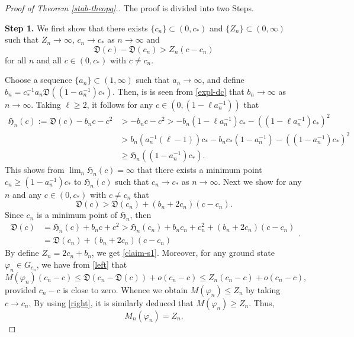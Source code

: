 \documentclass[10pt]{article}
\newcommand{\paar}[1]{\left( #1 \right)}
\newcommand{\fd}{\mathfrak{D}}
\newcommand{\fh}{\mathfrak{H}}
\numberwithin{equation}{section}
\newcommand{\ff}{\varphi}
\begin{document}
	\begin{proof}[Proof of Theorem \ref{stab-theopq}.]
		The proof is divided into two Steps.
		
		
		\textbf{Step 1.} We first show that there exists $\{c_n\}\subset(0,c_\ast)$ and $\{Z_n\}\subset(0,\infty)$ such that $Z_n\to\infty$, $c_n\to c_\ast$ as $n\to\infty$ and
		\begin{equation}\label{claim-s1}
			\fd(c)-\fd(c_n)>Z_n(c-c_n)
		\end{equation}
		for all $n$ and all $c\in(0,c_\ast)$ with $c\neq c_n$.
		
		Choose a sequence $\{a_n\}\subset(1,\infty)$ such that $a_n\to\infty$, and define $b_n=c_\ast^{-1}a_n\fd((1-a_n^{-1})c_\ast)$. Then, is is seen from \eqref{expl-dc} that $b_n\to\infty$ as $n\to\infty$. Taking $\ell\geq2$, it follows for any $c\in(0,(1-\ell a_n^{-1}))$ that
		\[
		\begin{split}
			\fh_n(c):=\fd(c)-b_nc-c^2&>-b_nc -c^2>-b_n(1-\ell a_n^{-1})c_\ast-\paar{(1-\ell a_n^{-1})c_\ast}^2\\
			&>
			b_n(a_n^{-1}(\ell-1))c_\ast-b_nc_\ast(1-a_n^{-1})-\paar{(1-a_n^{-1})c_\ast}^2\\&\geq \fh_n((1-a_n^{-1})c_\ast).
		\end{split}
		\]
		This shows from $\lim_n\fh_n(c)=\infty$ that there exists a minimum point $c_n\geq (1-a_n^{-1})c_\ast$ to $\fh_n(c)$ such that $c_n\to c_\ast$ as $n\to\infty$. Next we show for any $n$ and any $c\in(0,c_\ast)$ with $c\neq c_n$ that 
		\[
		\fd(c)>\fd(c_n)+(b_n+2c_n)(c-c_n).
		\]
		Since $c_n$ is a minimum point of $\fh_n$, then
		\[
		\begin{split}
			\fd(c)&=\fh_n(c)+b_nc+c^2
			>
			\fh_n(c_n)+b_nc_n+c^2_n
			+(b_n+2c_n)(c-c_n)\\&
			=\fd(c_n)+(b_n+2c_n)(c-c_n)
		\end{split}.
		\]
		By define $Z_n=2c_n+b_n$, we get \eqref{claim-s1}. Moreover, for any ground state $\ff_n\in G_{c_n}$, we have from \eqref{left} that
		\[
		M(\ff_n)(c_n-c)\leq \fd(c_n-\fd(c))+o(c_n-c)\leq Z_n(c_n-c)+o(c_n-c),
		\]
		provided $c_n-c$ is close to zero. Whence we obtain $M(\ff_n)\leq Z_n$ by taking $c\to c_n$. By using \eqref{right}, it is similarly deduced that $M(\ff_n)\geq Z_n$. Thus,
		\[
		M_n(\ff_n)=Z_n.
		\]
		
		
		
		
		
		
		
		
		
		
		

\end{proof}
\end{document}
